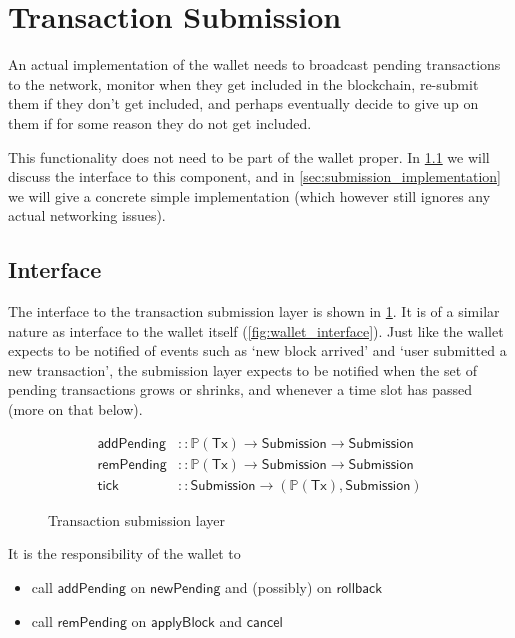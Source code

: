 \documentclass{article}
\theoremstyle{definition}{
  \newtheorem{lemma}{Lemma}[section] %
  \newtheorem{definition}[lemma]{Definition}
}
\theoremstyle{theorem}{
  \newtheorem{invariant}[lemma]{Invariant}
  \newtheorem{proofobligation}[lemma]{Proof Obligation}
}
\numberwithin{equation}{lemma}
\begin{document}
\section{Transaction Submission}
\label{sec:transaction_submission}

An actual implementation of the wallet needs to broadcast pending transactions
to the network, monitor when they get included in the blockchain, re-submit them
if they don't get included, and perhaps eventually decide to give up on them if
for some reason they do not get included.

This functionality does not need to be part of the wallet proper. In
\cref{sec:submission_interface} we will discuss the interface to this
component, and in \cref{sec:submission_implementation} we will give a
concrete simple implementation (which however still ignores any actual
networking issues).

\subsection{Interface}
\label{sec:submission_interface}

The interface to the transaction submission layer is shown in
\cref{fig:transaction_submission_layer}. It is of a similar nature as
interface to the wallet itself (\cref{fig:wallet_interface}). Just like
the wallet expects to be notified of events such as `new block arrived' and
`user submitted a new transaction', the submission layer expects to be notified
when the set of pending transactions grows or shrinks, and whenever a time slot
has passed (more on that below).

\begin{figure}
\begin{align*}
\mathsf{addPending} & :: \mathbb{P}(\mathsf{Tx}) \rightarrow \mathsf{Submission} \rightarrow \mathsf{Submission} \\
\mathsf{remPending} & :: \mathbb{P}(\mathsf{Tx}) \rightarrow \mathsf{Submission} \rightarrow \mathsf{Submission} \\
\mathsf{tick}       & :: \mathsf{Submission} \rightarrow (\mathbb{P}(\mathsf{Tx}), \mathsf{Submission})
\end{align*}
\caption{\label{fig:transaction_submission_layer}Transaction submission layer}
\end{figure}

It is the responsibility of the wallet to
%
\begin{itemize}
\item call $\mathsf{addPending}$ on $\mathsf{newPending}$ and (possibly) on $\mathsf{rollback}$
\item call $\mathsf{remPending}$ on $\mathsf{applyBlock}$ and $\mathsf{cancel}$
\end{itemize}
\end{document}
